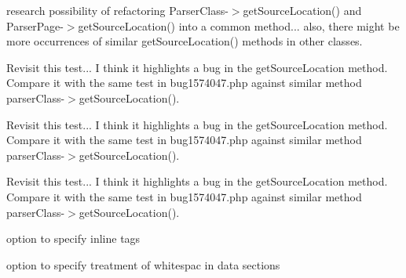 \begin{DoxyRefList}
research possibility of refactoring \-Parser\-Class-\/$>$get\-Source\-Location() and \-Parser\-Page-\/$>$get\-Source\-Location() into a common method... also, there might be more occurrences of similar get\-Source\-Location() methods in other classes.  
\item[\label{todo__todo000185}%
\hypertarget{todo__todo000185}{}%
\-Global \hyperlink{classtests___parser_page_get_source_location_tests_a94bfc35295afbf47a5b1eb7883e508c6}{tests\-\_\-\-Parser\-Page\-Get\-Source\-Location\-Tests} ()]\-Revisit this test... \-I think it highlights a bug in the get\-Source\-Location method. \-Compare it with the same test in bug1574047.\-php against similar method parser\-Class-\/$>$get\-Source\-Location().  
\item[\label{todo__todo000186}%
\hypertarget{todo__todo000186}{}%
\-Global \hyperlink{classtests___parser_page_get_source_location_tests_a847f160fa013c177f1526beb60cf4f79}{tests\-\_\-\-Parser\-Page\-Get\-Source\-Location\-Tests} ()]\-Revisit this test... \-I think it highlights a bug in the get\-Source\-Location method. \-Compare it with the same test in bug1574047.\-php against similar method parser\-Class-\/$>$get\-Source\-Location().  
\item[\label{todo__todo000187}%
\hypertarget{todo__todo000187}{}%
\-Global \hyperlink{classtests___parser_page_get_source_location_tests_a50ce479875ea0be03800dc0b6728ceb6}{tests\-\_\-\-Parser\-Page\-Get\-Source\-Location\-Tests} ()]\-Revisit this test... \-I think it highlights a bug in the get\-Source\-Location method. \-Compare it with the same test in bug1574047.\-php against similar method parser\-Class-\/$>$get\-Source\-Location().  
\item[\label{todo__todo000018}%
\hypertarget{todo__todo000018}{}%
\-Namespace \hyperlink{namespace_x_m_l___beautifier}{\-X\-M\-L\-\_\-\-Beautifier} ]option to specify inline tags 

option to specify treatment of whitespac in data sections 


\end{DoxyRefList}
